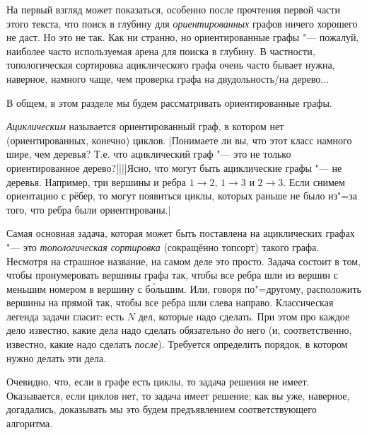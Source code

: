 
На первый взгляд может показаться, особенно после прочтения первой части этого текста, что поиск в 
глубину для \textit{ориентированных} графов ничего хорошего не даст. Но это не так. 
Как ни странно, но ориентированные графы "--- пожалуй, наиболее часто используемая арена для поиска 
в глубину. В частности, топологическая сортировка ациклического графа очень часто бывает нужна, 
наверное, намного чаще, чем проверка графа на двудольность/на дерево...

В общем, в этом разделе мы будем рассматривать ориентированные графы.

\textit{Ациклическим} называется ориентированный граф, в котором нет (ориентированных, конечно) 
циклов. 
|Понимаете ли вы, что этот класс намного шире, чем деревья? Т.е.
что ациклический граф "--- это не только ориентированное дерево?||||Ясно, что могут быть ациклические графы "--- не деревья. Например, три вершины и 
ребра $1\to 2$, $1\to 3$ и $2\to 3$. Если снимем ориентацию с рёбер, то могут появиться циклы,
которых раньше не было из"=за того, что ребра были ориентированы.|\label{acyclicnontree}

Самая основная задача, которая может быть поставлена на ациклических графах "--- это 
\textit{топологическая сортировка} (сокращённо топсорт) такого графа. Несмотря на страшное 
название, на самом деле это 
просто. Задача состоит в том, чтобы пронумеровать вершины графа так, чтобы все ребра шли из вершин 
с меньшим номером в вершину с б\'{о}льшим. Или, говоря по"=другому, расположить вершины на прямой 
так, чтобы все ребра шли слева направо. Классическая легенда задачи гласит: есть $N$ дел, которые 
надо сделать. При этом про каждое дело известно, какие дела надо сделать обязательно \textit{до} 
него (и, соответственно, известно, какие надо сделать \textit{после}). Требуется определить 
порядок, в котором нужно делать эти дела.

Очевидно, что, если в графе есть циклы, то задача решения не имеет. Оказывается, если циклов нет, 
то задача имеет решение; как вы уже, наверное, догадались, доказывать мы это будем предъявлением 
соответствующего алгоритма.

